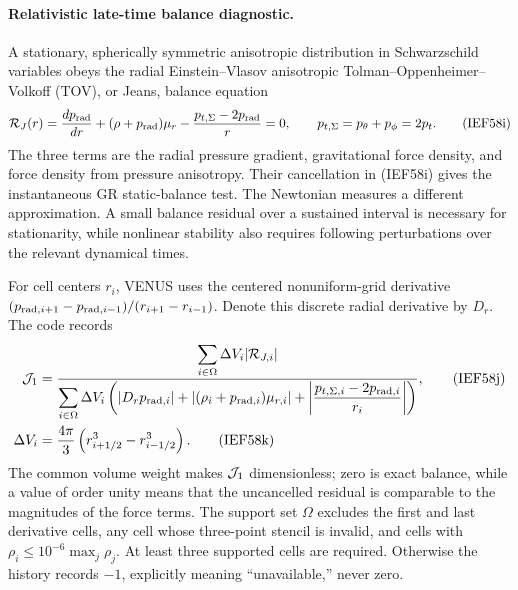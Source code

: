 \paragraph{Relativistic late-time balance diagnostic.}
A stationary, spherically symmetric anisotropic distribution in Schwarzschild
variables obeys the radial Einstein--Vlasov anisotropic
Tolman--Oppenheimer--Volkoff (TOV), or Jeans, balance
equation
\begin{equation*}
 {\cal R}_{J}(r)
 =\frac{d p_{\rm rad}}{dr}+(\rho+p_{\rm rad})\mu_r
  -\frac{p_{t,\Sigma}-2p_{\rm rad}}{r}=0,
 \qquad p_{t,\Sigma}=p_\theta+p_\phi=2p_t .              \tag{IEF58i}
\end{equation*}
The three terms are the radial pressure gradient, gravitational force
density, and force density from pressure anisotropy.  Their cancellation in
(IEF58i) gives the instantaneous GR static-balance test.  The Newtonian
 measures a different approximation.  A small balance
residual over a sustained interval is necessary for stationarity, while
nonlinear stability also requires following perturbations over the relevant
dynamical times.

For cell centers \(r_i\), VENUS uses the centered nonuniform-grid derivative
\((p_{{\rm rad},i+1}-p_{{\rm rad},i-1})/(r_{i+1}-r_{i-1})\).
Denote this discrete radial derivative by \(D_r\).  The code records
\begin{align}
 {\cal J}_{1}
 &=\frac{\displaystyle\sum_{i\in\Omega}\Delta V_i
                       |{\cal R}_{J,i}|}
        {\displaystyle\sum_{i\in\Omega}\Delta V_i
          \left(\left|D_rp_{{\rm rad},i}\right|
          +\left|(\rho_i+p_{{\rm rad},i})\mu_{r,i}\right|
          +\left|\frac{p_{t,\Sigma,i}-2p_{{\rm rad},i}}{r_i}\right|\right)},
                                                               \tag{IEF58j}\\
 \Delta V_i&=\frac{4\pi}{3}
       \left(r_{i+1/2}^{3}-r_{i-1/2}^{3}\right).              \tag{IEF58k}
\end{align}
The common volume weight makes \({\cal J}_1\) dimensionless; zero is exact
balance, while a value of order unity means that the uncancelled residual is
comparable to the magnitudes of the force terms.  The support set \(\Omega\)
excludes the first and last derivative cells, any cell whose three-point
stencil is invalid, and cells with
\(\rho_i\le10^{-6}\max_j\rho_j\).  At least three supported cells are
required.  Otherwise the history records \(-1\), explicitly meaning
``unavailable,'' never zero.

